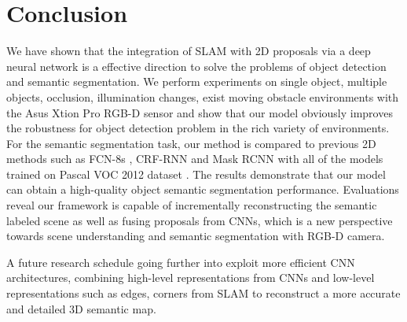 \documentclass[conference]{IEEEtran}
\begin{document}
\section{\textbf{Conclusion}}

We have shown that  the integration of SLAM with 2D proposals via a deep neural network is a effective direction to solve the problems of object detection and semantic segmentation. We perform experiments on  single object, multiple objects, occlusion, illumination changes, exist moving obstacle environments with the Asus Xtion Pro RGB-D sensor and show that our model obviously improves the robustness for object detection problem in the rich variety of environments. For the semantic segmentation task, our method is compared to previous 2D methods such as FCN-8s \cite{long2015fully}, CRF-RNN \cite{Zheng2015} and Mask RCNN \cite{He2017}with all of the models trained on Pascal VOC 2012 dataset \cite{Everingham15}. The results demonstrate that our model can obtain a high-quality object semantic segmentation performance. Evaluations reveal our framework is capable of incrementally reconstructing the semantic labeled scene as well as fusing proposals from CNNs, which is a new perspective towards scene understanding and semantic segmentation with RGB-D camera.

A future research schedule going further into exploit more efficient CNN architectures, combining high-level representations from CNNs and low-level representations such as edges, corners from SLAM to reconstruct a more accurate and detailed 3D semantic map.
%
\IEEEpeerreviewmaketitle
\end{document}
